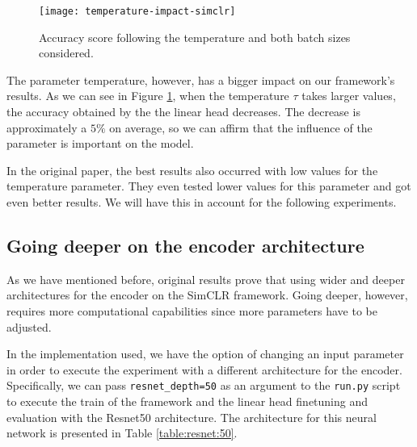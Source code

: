 \begin{figure}[H] 
    \centering
        \texttt{[image: temperature-impact-simclr]}%
       
        \caption{Accuracy score following the temperature and both batch sizes considered.}
        
    \label{exp:simclr:temperature:impact}
\end{figure}

The parameter temperature, however, has a bigger impact on our framework's results. As we can see in Figure \ref{exp:simclr:temperature:impact}, when the temperature $\tau$ takes larger values, the accuracy obtained by the the linear head decreases. The decrease is approximately a $5\%$ on average, so we can affirm that the influence of the parameter is important on the model.

In the original paper, the best results also occurred with low values for the temperature parameter. They even tested lower values for this parameter and got even better results. We will have this in account for the following experiments.

\subsection{Going deeper on the encoder architecture}
\label{experiments:simclr:second}


As we have mentioned before, original results prove that using wider and deeper architectures for the encoder on the SimCLR framework. Going deeper, however, requires more computational capabilities since more parameters have to be adjusted.

In the implementation used, we have the option of changing an input parameter in order to execute the experiment with a different architecture for the encoder. Specifically, we can pass \lstinline{resnet_depth=50} as an argument to the \lstinline{run.py} script to execute the train of the framework and the linear head finetuning and evaluation with the Resnet50 architecture. The architecture for this neural network is presented in Table \ref{table:resnet:50}.


